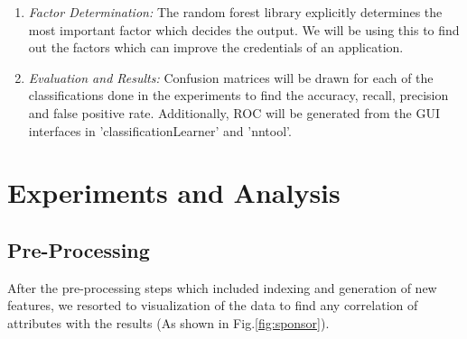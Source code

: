 \documentclass{article} %
\begin{document}
\begin{enumerate}
		\item \emph{Factor Determination:} The random forest library explicitly determines the most important factor which decides the output. We will be using this to find out the factors which can improve the credentials of an application.
		
		\item \emph{Evaluation and Results:} Confusion matrices will be drawn for each of the classifications done in the experiments to find the accuracy, recall, precision and false positive rate. Additionally, ROC will be generated from the GUI interfaces in 'classificationLearner' and 'nntool'.
		
	\end{enumerate}
	
	
	\section{Experiments and Analysis}
	
	\subsection{Pre-Processing}
	After the pre-processing steps which included indexing and generation of new features, we resorted to visualization of the data to find any correlation of attributes with the results (As shown in Fig.\ref{fig:sponsor}).
	
\end{document}
